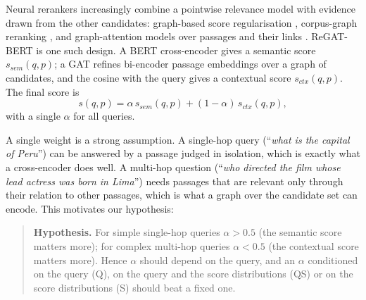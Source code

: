 \documentclass[11pt]{article}
\newcommand{\sem}{s_{\mathit{sem}}}
\newcommand{\ctx}{s_{\mathit{ctx}}}
\newcommand{\gate}[1]{\textsc{#1}}
\begin{document}
Neural rerankers increasingly combine a pointwise relevance model with evidence drawn from the
other candidates: graph-based score regularisation \citep{diaz2005regularizing,kurland2005pagerank},
corpus-graph reranking \citep{macavaney2022gar}, and graph-attention models over passages and their
links \citep{asai2020learning}. ReGAT-BERT \citep{regatbert} is one such design. A BERT
cross-encoder \citep{nogueira2019passage} gives a semantic score $\sem(q,p)$; a GAT
\citep{velickovic2018gat} refines bi-encoder passage embeddings over a graph of candidates, and the
cosine with the query gives a contextual score $\ctx(q,p)$. The final score is
\begin{equation}
  \label{eq:fusion}
  s(q,p) = \alpha\, \sem(q,p) + (1-\alpha)\, \ctx(q,p),
\end{equation}
with a single $\alpha$ for all queries.

A single weight is a strong assumption. A single-hop query (``\emph{what is the capital of Peru}'')
can be answered by a passage judged in isolation, which is exactly what a cross-encoder does well.
A multi-hop question (``\emph{who directed the film whose lead actress was born in Lima}'') needs
passages that are relevant only through their relation to other passages, which is what a graph over
the candidate set can encode. This motivates our hypothesis:

\begin{quote}
\textbf{Hypothesis.} For simple single-hop queries $\alpha>0.5$ (the semantic score matters more);
for complex multi-hop queries $\alpha<0.5$ (the contextual score matters more). Hence $\alpha$
should depend on the query, and an $\alpha$ conditioned on the query (\gate{Q}), on the query and
the score distributions (\gate{QS}) or on the score distributions (\gate{S}) should beat a fixed one.
\end{quote}
\end{document}
